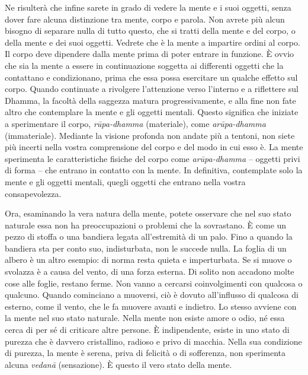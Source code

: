 Ne risulterà che infine sarete in grado di vedere la mente e i suoi
oggetti, senza dover fare alcuna distinzione tra mente, corpo e parola.
Non avrete più alcun bisogno di separare nulla di tutto questo, che si
tratti della mente e del corpo, o della mente e dei suoi oggetti.
Vedrete che è la mente a impartire ordini al corpo. Il corpo deve
dipendere dalla mente prima di poter entrare in funzione. È ovvio che
sia la mente a essere in continuazione soggetta ai differenti oggetti
che la contattano e condizionano, prima che essa possa esercitare un
qualche effetto sul corpo. Quando continuate a rivolgere l'attenzione
verso l'interno e a riflettere sul Dhamma, la facoltà della saggezza
matura progressivamente, e alla fine non fate altro che contemplare la
mente e gli oggetti mentali. Questo significa che iniziate a
sperimentare il corpo, \emph{rūpa-dhamma} (materiale), come
\emph{arūpa-dhamma} (immateriale). Mediante la visione profonda non
andate più a tentoni, non siete più incerti nella vostra comprensione
del corpo e del modo in cui esso è. La mente sperimenta le
caratteristiche fisiche del corpo come \emph{arūpa-dhamma} -- oggetti
privi di forma -- che entrano in contatto con la mente. In definitiva,
contemplate solo la mente e gli oggetti mentali, quegli oggetti che
entrano nella vostra consapevolezza.

Ora, esaminando la vera natura della mente, potete osservare che nel suo
stato naturale essa non ha preoccupazioni o problemi che la sovrastano.
È come un pezzo di stoffa o una bandiera legata all'estremità di un
palo. Fino a quando la bandiera sta per conto suo, indisturbata, non le
succede nulla. La foglia di un albero è un altro esempio: di norma resta
quieta e imperturbata. Se si muove o svolazza è a causa del vento, di
una forza esterna. Di solito non accadono molte cose alle foglie,
restano ferme. Non vanno a cercarsi coinvolgimenti con qualcosa o
qualcuno. Quando cominciano a muoversi, ciò è dovuto all'influsso di
qualcosa di esterno, come il vento, che le fa muovere avanti e indietro.
Lo stesso avviene con la mente nel suo stato naturale. Nella mente non
esiste amore o odio, né essa cerca di per sé di criticare altre persone.
È indipendente, esiste in uno stato di purezza che è davvero
cristallino, radioso e privo di macchia. Nella sua condizione di
purezza, la mente è serena, priva di felicità o di sofferenza, non
sperimenta alcuna \emph{vedanā} (sensazione). È questo il vero stato
della mente.

